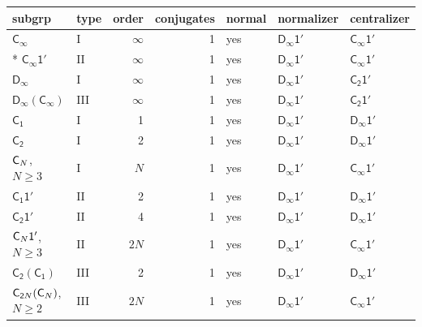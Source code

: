 \documentclass[10pt,a4paper]{article}
\makeatletter
\def\grouprule#1#2{\noalign{\marks\LTgroupmarks{\the\belowrulesep}\nobreak\vskip#1%
  \vskip\aboverulesep}\multispan\LT@cols\unskip{\leaders\hrule\@height#2\hfill\kern\z@}\cr
  \noalign{\penalty\LTrulebreak\vskip\belowrulesep\global\@lastruleclass\z@}}
\numberwithin{equation}{section}
\newcommand{\grp}[1]{\mathsf{#1}}
\makeatother
\begin{document}
{\small\begin{longtable}{@{}llrrlll@{}}\toprule
subgrp & type & order & conjugates & normal & normalizer & centralizer\\\midrule\endhead
\bottomrule\endfoot\endlastfoot
\href{../../../rotation/data/pdf/Cinf.pdf}{$\grp{C_{\infty}}$} & I & $\infty$ & 1 & yes & \href{Dinf-1p.pdf}{$\grp{D_{\infty}1'}$} & \href{Cinf-1p.pdf}{$\grp{C_{\infty}1'}$}\\*
\href{Cinf-1p.pdf}{$\grp{C_{\infty}1'}$} & II & $\infty$ & 1 & yes & \href{Dinf-1p.pdf}{$\grp{D_{\infty}1'}$} & \href{Cinf-1p.pdf}{$\grp{C_{\infty}1'}$}\\
\href{../../../rotation/data/pdf/Dinf.pdf}{$\grp{D_{\infty}}$} & I & $\infty$ & 1 & yes & \href{Dinf-1p.pdf}{$\grp{D_{\infty}1'}$} & \href{C2-1p.pdf}{$\grp{C_{2}1'}$}\\
\href{Dinf-Cinf.pdf}{$\grp{D_{\infty}}(\grp{C_{\infty}})$} & III & $\infty$ & 1 & yes & \href{Dinf-1p.pdf}{$\grp{D_{\infty}1'}$} & \href{C2-1p.pdf}{$\grp{C_{2}1'}$}\\
\grouprule{0pt}{\lightrulewidth}
\href{../../../rotation/data/pdf/C1.pdf}{$\grp{C_{1}}$} & I & 1 & 1 & yes & \href{Dinf-1p.pdf}{$\grp{D_{\infty}1'}$} & \href{Dinf-1p.pdf}{$\grp{D_{\infty}1'}$}\\
\href{../../../rotation/data/pdf/C2.pdf}{$\grp{C_{2}}$} & I & 2 & 1 & yes & \href{Dinf-1p.pdf}{$\grp{D_{\infty}1'}$} & \href{Dinf-1p.pdf}{$\grp{D_{\infty}1'}$}\\
$\grp{C_{\mathnormal{N}}}$, $N \ge 3$ & I & $N$ & 1 & yes & \href{Dinf-1p.pdf}{$\grp{D_{\infty}1'}$} & \href{Cinf-1p.pdf}{$\grp{C_{\infty}1'}$}\\
\href{C1-1p.pdf}{$\grp{C_{1}1'}$} & II & 2 & 1 & yes & \href{Dinf-1p.pdf}{$\grp{D_{\infty}1'}$} & \href{Dinf-1p.pdf}{$\grp{D_{\infty}1'}$}\\
\href{C2-1p.pdf}{$\grp{C_{2}1'}$} & II & 4 & 1 & yes & \href{Dinf-1p.pdf}{$\grp{D_{\infty}1'}$} & \href{Dinf-1p.pdf}{$\grp{D_{\infty}1'}$}\\
$\grp{C_{\mathnormal{N}}1'}$, $N \ge 3$ & II & $2N$ & 1 & yes & \href{Dinf-1p.pdf}{$\grp{D_{\infty}1'}$} & \href{Cinf-1p.pdf}{$\grp{C_{\infty}1'}$}\\
\href{C2-C1.pdf}{$\grp{C_{2}}(\grp{C_{1}})$} & III & 2 & 1 & yes & \href{Dinf-1p.pdf}{$\grp{D_{\infty}1'}$} & \href{Dinf-1p.pdf}{$\grp{D_{\infty}1'}$}\\
$\grp{C_{2\mathnormal{N}}}(\grp{C_{\mathnormal{N}}})$, $N \ge 2$ & III & $2N$ & 1 & yes & \href{Dinf-1p.pdf}{$\grp{D_{\infty}1'}$} & \href{Cinf-1p.pdf}{$\grp{C_{\infty}1'}$}\\

\end{longtable}}
\end{document}
